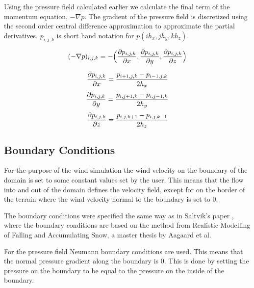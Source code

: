 Using the pressure field calculated earlier we calculate the final term of the 
momentum equation, $-\nabla p$. The gradient of the pressure field is discretized 
using the second order central difference approximation to approximate the 
partial derivatives. $p_{i,j,k}$ is short hand notation for $p(ih_x, jh_y, kh_z)$.

$$ (-\nabla p)_{i,j,k} = -\Big( \frac{\partial p_{i,j,k}}{\partial x}, \frac{\partial p_{i,j,k}}{\partial y}, \frac{\partial p_{i,j,k}}{\partial z} \Big) $$

$$ \frac{\partial p_{i,j,k}}{\partial x} = \frac{p_{i+1,j,k} - p_{i-1,j,k}}{2h_x} $$
$$ \frac{\partial p_{i,j,k}}{\partial y} = \frac{p_{i,j+1,k} - p_{i,j-1,k}}{2h_y} $$
$$ \frac{\partial p_{i,j,k}}{\partial z} = \frac{p_{i,j,k+1} - p_{i,j,k-1}}{2h_z} $$

\subsection{Boundary Conditions}

For the purpose of the wind simulation the wind velocity on the boundary of the
domain is set to some constant values set by the user. This means that the flow
into and out of the domain defines the velocity field, except for on the border
of the terrain where the wind velocity normal to the boundary is set to 0.

The boundary conditions were specified the same way as in Saltvik's paper
\cite{originalSnowThesis}, where the boundary conditions are based 
on the method from Realistic Modelling of Falling and Accumulating Snow, a master
thesis by Aagaard et al\cite{danishSnowThesis}. 

For the pressure field Neumann boundary conditions are used. This means that
the normal pressure gradient along the boundary is 0. This is done by setting
the pressure on the boundary to be equal to the pressure on the inside of the 
boundary.
